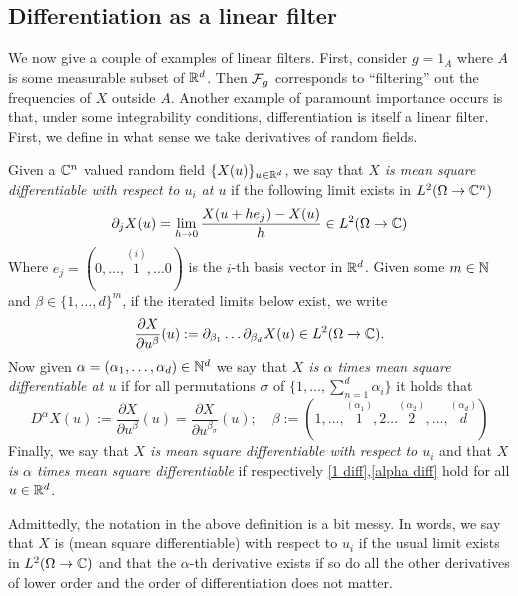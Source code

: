 \documentclass[
    a4paper,
    DIV=14,
    abstract=true,
    numbers=noenddot
]{scrartcl}
\begin{document}
\subsection{Differentiation as a linear filter}
We now give a couple of examples of linear filters. First, consider $g=1_A$ where  $A$ is some measurable subset of  $\mathbb{R}^d$. Then $\mathcal{F}_g$ corresponds to ``filtering'' out the frequencies of $X$ outside  $A$. Another example of paramount importance occurs is that, under some integrability conditions, differentiation is itself a linear filter. First, we define in what sense we take derivatives of random fields.
\begin{definition}
	Given a $\mathbb{C}^n$ valued random field $\{X(u)\}_{u\in\mathbb{R}^d}$, we say that \emph{$X$ is mean square differentiable with respect to $u_i$ at $u$} if the following limit exists in $L^2(\Omega\to\mathbb{C}^n)$
	\begin{equation}\label{1 diff}
		\partial_j X(u)=\lim_{h \to 0}\frac{X(u+he_j)-X(u)}{h}\in L^2(\Omega\to\mathbb{C})
	\end{equation}
	Where $e_j=(0,\ldots,\overset{(i)}{1},\ldots 0)$ is the $i$-th basis vector in  $\mathbb{R}^d$.
	Given some $m\in \mathbb{N}$ and $\beta\in\{1,\ldots,d\}^m$, if the iterated limits below exist, we write
	\begin{equation*}
		\frac{\partial X}{\partial u^\beta}(u):=\partial _{\beta_1}\ldots \partial _{\beta_d}X(u)\in L^2(\Omega\to\mathbb{C}) .
	\end{equation*}
	Now given $\alpha=(\alpha_1,\ldots,\alpha_d)\in \mathbb{N}^d$    we say that \emph{$X$ is  $\alpha$ times mean square differentiable at $u$} if for all permutations $\sigma$ of $\{1,\ldots,\sum_{n=1}^{d}\alpha_i\}$ it holds that
	\begin{equation}\label{alpha diff}
		D^\alpha X(u):=\frac{\partial X}{\partial u^\beta}(u)= \frac{\partial X}{\partial u^{\beta_\sigma}}(u);\quad \beta:=(1,\ldots,\overset{(\alpha_1)}{1},2\ldots \overset{(\alpha_2)}{2},\ldots,\overset{(\alpha_d)}{d})
	\end{equation}
	Finally, we say that \emph{$X$ is mean square differentiable with respect to $u_i$} and that \emph{ $X$ is $\alpha$ times mean square differentiable} if respectively \eqref{1 diff},\eqref{alpha diff}  hold for all $u\in \mathbb{R}^d$.
\end{definition}
Admittedly, the notation in the above definition is a bit messy. In words, we say that $X$ is (mean square differentiable) with respect to  $u_i$ if the usual limit exists in  $L^2(\Omega\to\mathbb{C})$ and that the $\alpha$-th derivative exists if so do all the other derivatives of lower order and the order of differentiation does not matter.\\
\end{document}
